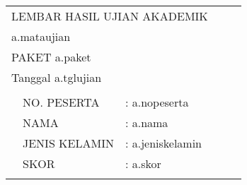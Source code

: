 \documentclass[12pt]{article}
\begin{document}
\thispagestyle{fancy}

\def\arraystretch{1.3}
\begin{table}[]
\centering
\begin{tabular}{llllm{11cm}l}

\multicolumn{5}{l}{\centerline{LEMBAR HASIL UJIAN AKADEMIK}   }       \\

\multicolumn{5}{l}{\centerline{a.mataujian}}                      \\

\multicolumn{5}{l}{\centerline{PAKET a.paket}}                           \\ \hline
\multicolumn{5}{l}{Tanggal a.tglujian}                        \\
\multicolumn{5}{l}{}                        \\
      & NO. PESERTA       & :  a.nopeserta    & 
\multicolumn{2}{l}{} \\
      & NAMA              & : a.nama    & 
\multicolumn{2}{l}{} \\
      & JENIS KELAMIN     & :  a.jeniskelamin   & 
\multicolumn{2}{l}{} \\
      & SKOR              & :  a.skor   & 
\multicolumn{2}{l}{} \\
      &                   &       &           &         
\end{tabular}
\end{table}
\def\arraystretch{1.5}
\end{document}
